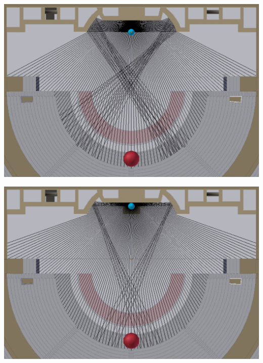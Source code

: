\begin{figureth}
\begin{subfigureth}{0.48\textwidth}
		\includegraphics[width=\linewidth]{images/test_source3}
		\caption{Reflexion des rayons sur le mur de scène pour une source située en [0 ; 14,5 ; 42,8].}
		\label{test_source3}
	\end{subfigureth}
	\quad
	\begin{subfigureth}{0.48\textwidth}
		\includegraphics[width=\linewidth]{images/test_source4}
		\caption{Reflexion des rayons sur le mur de scène pour une source située en [0 ; 16,5 ; 42,8].}
		\label{test_source4}
	\end{subfigureth}
\caption{Reflexion des rayons propagés depuis une source vers le mur de scène dans un plan horizontal.}	
\label{test_source}
\end{figureth}	

